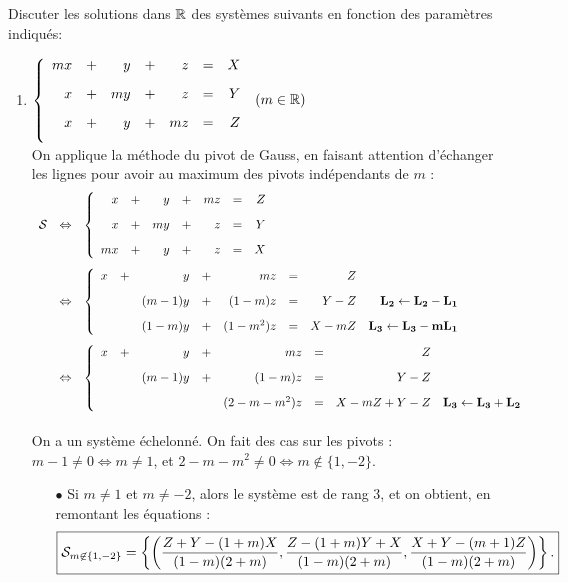 \documentclass[a4paper, 11pt,reqno]{article}
\begin{document}
\begin{correction}   \;
Discuter les solutions dans $\mathbb{R}$ des syst\`emes suivants en fonction des param\`etres indiqu\'es:
\begin{enumerate}
\item
$\left\lbrace\begin{array}{rrrrrrr}
mx &+ & y &+ & z & = & X\vsec\\
x &+ & my &+ & z & = & Y\vsec\\
x &+ & y &+ & mz & = & Z\vsec\\
\end{array}\right.$  $(m\in\mathbb{R})$\\
On applique la m\'ethode du pivot de Gauss, en faisant attention d'\'echanger les lignes pour avoir au maximum des pivots ind\'ependants de $m$ :
$$\begin{array}{rcl}
\mathcal{S} 
& \Leftrightarrow &
\left\lbrace\begin{array}{rrrrrrr}
x &+ & y &+ & mz & = & Z\vsec\\
x &+ & my &+ & z & = & Y\vsec\\
mx &+ & y &+ & z & = & X
\end{array}\right.\vsec\\
& \Leftrightarrow &
\left\lbrace\begin{array}{rrrrrrrr}
x &+ & y &+ & mz & = & Z\vsec\\
&& (m-1)y &+ & (1-m)z & = & Y-Z & \mathbf{L_2 \leftarrow L_2-L_1}\vsec\\
 & & (1-m)y &+ & (1-m^2)z & = & X-mZ &  \mathbf{L_3 \leftarrow L_3-mL_1}
\end{array}\right.\vsec\\
& \Leftrightarrow &
\left\lbrace\begin{array}{rrrrrrrr}
x &+ & y &+ & mz & = & Z\vsec\\
&& (m-1)y &+ & (1-m)z & = & Y-Z\vsec\\
 & & & & (2-m-m^2)z & = & X-mZ +Y-Z&  \mathbf{L_3 \leftarrow L_3+L_2}
\end{array}\right.\vsec\\
\end{array}$$
\noindent 
On a un syst\`eme \'echelonn\'e. On fait des cas sur les pivots : $m-1 \not=0 \Leftrightarrow m\not=1$, et $2-m-m^2\not=0 \Leftrightarrow m\not\in \{1,-2\}$. 
\begin{itemize}
\item[$\bullet$] Si $m\not= 1$ et $m\not= -2$, alors le syst\`eme est de rang $3$, et on obtient, en remontant les \'equations :
$$\fbox{$\displaystyle \mathcal{S}_{m\not \in \{1,-2\}}=\left\lbrace  \left( \displaystyle\frac{ Z+Y-(1+m)X   }{(1-m)(2+m)}, \displaystyle\frac{Z-(1+m)Y+X }{(1-m)(2+m)},  \displaystyle\frac{X+Y-(m+1)Z}{(1-m)(2+m)}    \right)  \right\rbrace.$}$$

\end{itemize}
\end{enumerate}
\end{correction}
\end{document}

